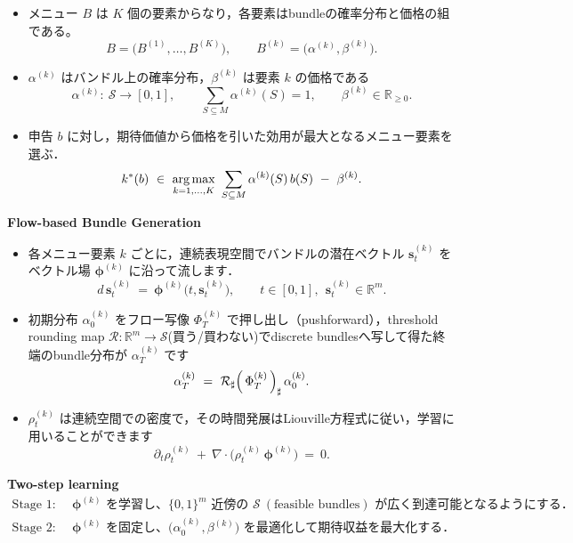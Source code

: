 \documentclass[a4paper]{article}
\begin{document}
\begin{itemize}
    \item メニュー $B$ は $K$ 個の要素からなり，各要素はbundleの確率分布と価格の組である。
    \begin{equation*}
        B=\bigl(B^{(1)},\dots,B^{(K)}\bigr),\qquad B^{(k)}=\bigl(\alpha^{(k)},\beta^{(k)}\bigr).
    \end{equation*}
    \item $\alpha^{(k)}$ はバンドル上の確率分布，$\beta^{(k)}$ は要素 $k$ の価格である
    \begin{equation*}
        \alpha^{(k)}:\ \mathcal{S}\to[0,1],\qquad \sum_{S\subseteq M}\alpha^{(k)}(S)=1,\qquad \beta^{(k)}\in\mathbb{R}_{\ge 0}.
    \end{equation*}
    \item 申告 $b$ に対し，期待価値から価格を引いた効用が最大となるメニュー要素を選ぶ．
    \begin{equation*}
        k^\ast(b)\ \in\ \argmax_{k=1,\dots,K}\ \sum_{S\subseteq M}\alpha^{(k)}(S)\,b(S)\ -\ \beta^{(k)}.
    \end{equation*}
\end{itemize}
\textbf{Flow-based Bundle Generation}
\begin{itemize}
    \item 各メニュー要素 $k$ ごとに，連続表現空間でバンドルの潜在ベクトル $\bm{s}^{(k)}_t$ をベクトル場 $\bm{\phi}^{(k)}$ に沿って流します．
    \begin{equation*}
        d\,\bm{s}^{(k)}_t\ =\ \bm{\phi}^{(k)}\!\bigl(t,\bm{s}^{(k)}_t\bigr),\qquad t\in[0,1],\ \ \bm{s}^{(k)}_t\in\mathbb{R}^m.
    \end{equation*}
    \item 初期分布 $\alpha_0^{(k)}$ をフロー写像 $\Phi^{(k)}_{T}$ で押し出し（pushforward），threshold rounding map $\mathcal{R}:\mathbb{R}^m\to\mathcal{S}$(買う/買わない)でdiscrete bundlesへ写して得た終端のbundle分布が $\alpha_T^{(k)}$ です
    \begin{equation*}
        \alpha_T^{(k)}\ =\ \mathcal{R}_{\sharp}\Bigl(\,\Phi^{(k)}_{T}\,\Bigr)_{\sharp}\,\alpha_0^{(k)}.
    \end{equation*}
    \item $\rho^{(k)}_t$ は連続空間での密度で，その時間発展はLiouville方程式に従い，学習に用いることができます
    \begin{equation*}
    \partial_t\rho^{(k)}_t\ +\ \nabla\!\cdot\!\bigl(\rho^{(k)}_t\,\bm{\phi}^{(k)}\bigr)\ =\ 0.
    \end{equation*}
\end{itemize}
\textbf{Two-step learning}
\[
\begin{aligned}
\text{Stage 1:}\quad
&\bm{\phi}^{(k)}\text{ を学習し、}
\{0,1\}^m\text{ 近傍の }\mathcal{S}\ (\text{feasible bundles})
\text{ が広く到達可能となるようにする．}\\
\text{Stage 2:}\quad
&\bm{\phi}^{(k)}\text{ を固定し、}
\bigl(\alpha_0^{(k)},\beta^{(k)}\bigr)\text{ を最適化して期待収益を最大化する．}
\end{aligned}
\]


\nocite{*}
\printbibliography
\end{document}
